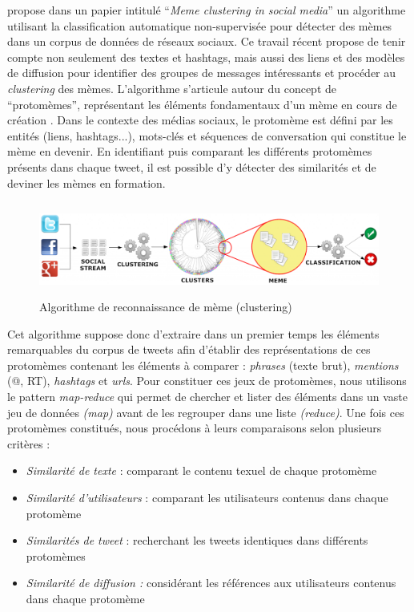 \cite{Ferrara2013} propose dans un papier intitulé {\textquotedblleft}\textit{Meme clustering in social media}{\textquotedblright} un algorithme utilisant la classification automatique non-supervisée pour détecter des mèmes dans un corpus de données de réseaux sociaux. Ce travail récent propose de tenir compte non seulement des textes et hashtags, mais aussi des liens et des modèles de diffusion pour identifier des groupes de messages intéressants et procéder au \textit{clustering }des mèmes. L{\textquoteright}algorithme s{\textquoteright}articule autour du concept de {\textquotedblleft}protomèmes{\textquotedblright}, représentant les éléments fondamentaux d{\textquoteright}un mème en cours de création \citep{Gabora1995}. Dans le contexte des médias sociaux, le protomème est défini par les entités (liens, hashtags...), mots-clés et séquences de conversation qui constitue le mème en devenir. En identifiant puis comparant les différents protomèmes présents dans chaque tweet, il est possible d{\textquoteright}y détecter des similarités et de deviner les mèmes en formation.  

\begin{figure}[htbp]
    \centering
    \includegraphics[width=5.8894in,height=1.2114in]{figures/chap3/chapitre3-img6.png}
    \caption{Algorithme de reconnaissance de mème (clustering) \citep{Ferrara2013}}
\end{figure}

Cet algorithme suppose donc d{\textquoteright}extraire dans un premier temps les éléments remarquables du corpus de tweets afin d{\textquoteright}établir des représentations de ces protomèmes contenant les éléments à comparer : \textit{phrases} (texte brut), \textit{mentions }(@, RT), \textit{hashtags} et \textit{urls}. Pour constituer ces jeux de protomèmes, nous utilisons le pattern \textit{map-reduce} qui permet de chercher et lister des éléments dans un vaste jeu de données \textit{(map)} avant de les regrouper dans une liste \textit{(reduce)}. Une fois ces protomèmes constitués, nous procédons à leurs comparaisons selon plusieurs critères :

\begin{itemize}
\item \textit{Similarité de texte }: comparant le contenu texuel de chaque protomème 
\item \textit{Similarité d{\textquoteright}utilisateurs} : comparant les utilisateurs contenus dans chaque protomème
\item \textit{Similarités de tweet }: recherchant les tweets identiques dans différents protomèmes
\item \textit{Similarité de diffusion : }considérant les références aux utilisateurs contenus dans chaque protomème
\end{itemize}

